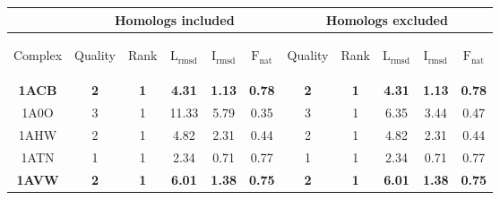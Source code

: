 
\begin{longtable}{c c c c c c|c c c c c}
&
\multicolumn{5}{c}{Homologs included} &
\multicolumn{5}{c}{Homologs excluded} \\
\hline
\begin{sideways}{Complex}\end{sideways}&\begin{sideways}{Quality}\end{sideways}&\begin{sideways}{Rank}\end{sideways}&\begin{sideways}$\mathrm{L_{rmsd}}$\end{sideways}&\begin{sideways}$\mathrm{I_{rmsd}}$\end{sideways}&\begin{sideways}$\mathrm{F_{nat}}$\end{sideways}&\begin{sideways}{Quality}\end{sideways}&\begin{sideways}{Rank}\end{sideways}&\begin{sideways}$\mathrm{L_{rmsd}}$\end{sideways}&\begin{sideways}$\mathrm{I_{rmsd}}$\end{sideways}&\begin{sideways}$\mathrm{F_{nat}}$\end{sideways}\\ 
 \hline
\textbf{\tiny 1ACB}&\textbf{\tiny 2}&\textbf{\tiny 1}&\textbf{\tiny 4.31}&\textbf{\tiny 1.13}&\textbf{\tiny 0.78}&\textbf{\tiny 2}&\textbf{\tiny 1}&\textbf{\tiny 4.31}&\textbf{\tiny 1.13}&\textbf{\tiny 0.78}\\ 
 {\tiny 1A0O}&{\tiny 3}&{\tiny 1}&{\tiny 11.33}&{\tiny 5.79}&{\tiny 0.35}&{\tiny 3}&{\tiny 1}&{\tiny 6.35}&{\tiny 3.44}&{\tiny 0.47}\\ 
 {\tiny 1AHW}&{\tiny 2}&{\tiny 1}&{\tiny 4.82}&{\tiny 2.31}&{\tiny 0.44}&{\tiny 2}&{\tiny 1}&{\tiny 4.82}&{\tiny 2.31}&{\tiny 0.44}\\ 
 {\tiny 1ATN}&{\tiny 1}&{\tiny 1}&{\tiny 2.34}&{\tiny 0.71}&{\tiny 0.77}&{\tiny 1}&{\tiny 1}&{\tiny 2.34}&{\tiny 0.71}&{\tiny 0.77}\\ 
 \textbf{\tiny 1AVW}&\textbf{\tiny 2}&\textbf{\tiny 1}&\textbf{\tiny 6.01}&\textbf{\tiny 1.38}&\textbf{\tiny 0.75}&\textbf{\tiny 2}&\textbf{\tiny 1}&\textbf{\tiny 6.01}&\textbf{\tiny 1.38}&\textbf{\tiny 0.75}\\ 

\end{longtable}
